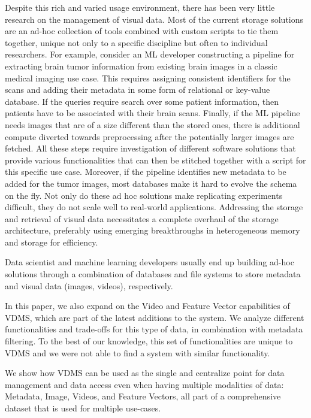 Despite this rich and varied usage environment, there has been very little
research on the management of visual data.
Most of the current storage solutions are
an ad-hoc collection of tools combined with custom scripts to tie them
together, unique not only to a specific discipline but often to individual
researchers. For example, consider an ML developer constructing a pipeline
for extracting brain tumor information from existing brain images in a
classic medical imaging use case. This requires assigning consistent
identifiers for the scans and adding their metadata in
some form of relational or key-value database. If the queries require
search over some patient information, then patients have to be associated
with their brain scans. Finally, if the ML pipeline needs images that
are of a size different than the stored ones, there is additional compute
diverted towards preprocessing after the potentially larger images are
fetched. All these steps require investigation of different software
solutions that provide various functionalities that can then be stitched
together with a script for this specific use case.
Moreover, if the pipeline identifies
new metadata to be added for the tumor images, most databases make it
hard to evolve the schema on the fly.
Not only do these ad hoc solutions make replicating experiments
difficult, they do not scale well to real-world applications.
Addressing the storage and retrieval of visual data necessitates a complete
overhaul of the storage architecture,
preferably using emerging breakthroughs in
heterogeneous memory and storage for efficiency.

Data scientist and machine learning developers usually end up building ad-hoc
solutions through a combination of databases and file systems to store metadata
and visual data (images, videos), respectively.

In this paper, we also expand on the Video and Feature Vector capabilities of
VDMS, which are part of the latest additions to the system.
We analyze different functionalities and trade-offs for this type of data,
in combination with metadata filtering. To the best of our knowledge, this
set of functionalities are unique to VDMS and we were not able to find a system
with similar functionality.

We show how VDMS can be used as the single and centralize point for data
management and data access even when having multiple modalities of data:
Metadata, Image, Videos, and Feature Vectors, all part of a comprehensive
dataset that is used for multiple use-cases.

